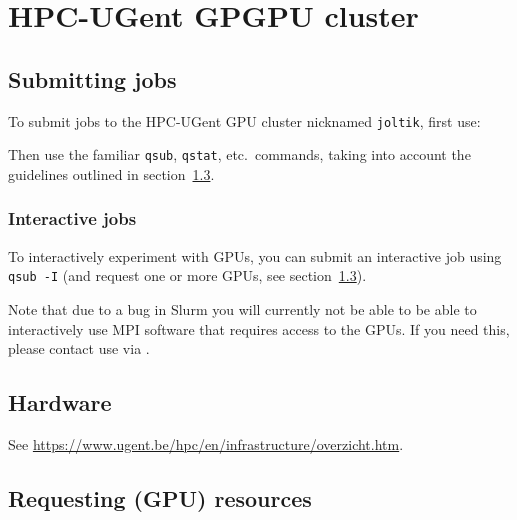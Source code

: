 \chapter{HPC-UGent GPGPU cluster}
\label{ch:gpu_ugent}


\section{Submitting jobs}
\label{sec:gpu_ugent_jobs}

To submit jobs to the HPC-UGent GPU cluster nicknamed \lstinline|joltik|, first use:

\begin{prompt}
\end{prompt}

Then use the familiar \lstinline|qsub|, \lstinline|qstat|, etc.\ commands, taking into account the guidelines outlined
in section~\ref{sec:gpu_ugent_resources}.

\subsection{Interactive jobs}
\label{sec:gpu_ugent_interactive_jobs}

To interactively experiment with GPUs, you can submit an interactive job using \lstinline|qsub -I| (and request
one or more GPUs, see section~\ref{sec:gpu_ugent_resources}).

Note that due to a bug in Slurm you will currently not be able to be able to interactively use
MPI software that requires access to the GPUs. If you need this, please contact use via \hpcinfo.



\section{Hardware}

See \url{https://www.ugent.be/hpc/en/infrastructure/overzicht.htm}.




\section{Requesting (GPU) resources}
\label{sec:gpu_ugent_resources}


